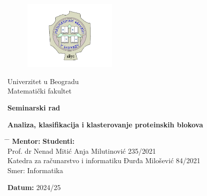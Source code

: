 \documentclass[a4paper,12pt]{article}
\begin{document}
\begin{titlepage}
    \centering
	\begin{figure}[htbp]
    	\centering
    	\includegraphics[width=0.4\textwidth]{./images/logo.png}
	\end{figure}
    { Univerzitet u Beogradu \\ Matematički fakultet\par}
	
    \vfill

    {\Large \textbf{Seminarski rad}\par}

    \vspace{1cm}

    {\Large \textbf{Analiza, klasifikacija i klasterovanje proteinskih blokova}\par}

    \vfill

    
	
	
	\begin{tabbing}
	\hspace{10cm} \= \hspace{10cm} \= \kill
	\textbf{Mentor:} \>  \textbf{Studenti:} \\
	Prof. dr Nenad Mitić \> Anja Milutinović 235/2021 \\
	Katedra za računarstvo i informatiku \> Đurđa Milošević 84/2021 \\
	\> Smer: Informatika
	\end{tabbing}

    \vfill

    \textbf{Datum:} 2024/25

\end{titlepage}
\newpage
\tableofcontents
\newpage
\end{document}
